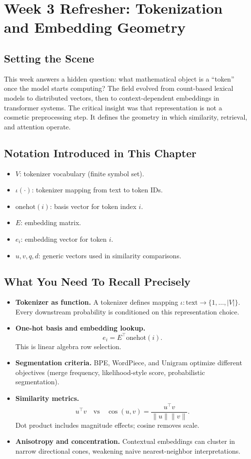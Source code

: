 \section{Week 3 Refresher: Tokenization and Embedding Geometry}

\subsection*{Setting the Scene}
This week answers a hidden question: what mathematical object is a ``token'' once the model starts computing? The field evolved from count-based lexical models to distributed vectors, then to context-dependent embeddings in transformer systems. The critical insight was that representation is not a cosmetic preprocessing step. It defines the geometry in which similarity, retrieval, and attention operate.

\subsection*{Notation Introduced in This Chapter}
\begin{itemize}[leftmargin=1.5em]
  \item $V$: tokenizer vocabulary (finite symbol set).
  \item $\iota(\cdot)$: tokenizer mapping from text to token IDs.
  \item $\mathrm{onehot}(i)$: basis vector for token index $i$.
  \item $E$: embedding matrix.
  \item $e_i$: embedding vector for token $i$.
  \item $u,v,q,d$: generic vectors used in similarity comparisons.
\end{itemize}

\subsection*{What You Need To Recall Precisely}
\begin{itemize}[leftmargin=1.5em]
  \item \textbf{Tokenizer as function.} A tokenizer defines mapping $\iota:\text{text}\to\{1,\dots,|V|\}$. Every downstream probability is conditioned on this representation choice.
  \item \textbf{One-hot basis and embedding lookup.}
  \[
    e_i = E^\top \mathrm{onehot}(i).
  \]
  This is linear algebra row selection.
  \item \textbf{Segmentation criteria.} BPE, WordPiece, and Unigram optimize different objectives (merge frequency, likelihood-style score, probabilistic segmentation).
  \item \textbf{Similarity metrics.}
  \[
    u^\top v \quad \text{vs} \quad \cos(u,v)=\frac{u^\top v}{\|u\|\|v\|}.
  \]
  Dot product includes magnitude effects; cosine removes scale.
  \item \textbf{Anisotropy and concentration.} Contextual embeddings can cluster in narrow directional cones, weakening naive nearest-neighbor interpretations.
\end{itemize}

